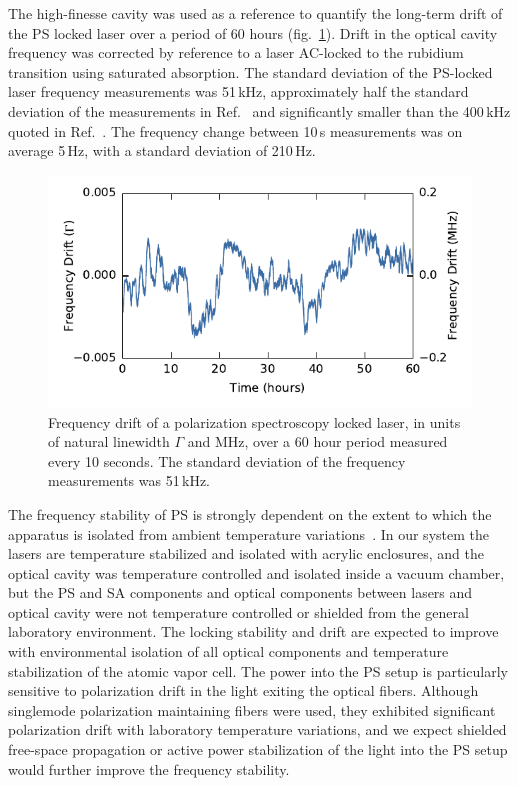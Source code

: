 The high-finesse cavity was used as a reference to quantify the long-term drift of the PS locked laser over a period of 60 hours (fig.~\ref{fig:drift}).
Drift in the optical cavity frequency was corrected by reference to a laser AC-locked to the rubidium transition using saturated absorption.
The standard deviation of the PS-locked laser frequency measurements was 51\,kHz, approximately half the standard deviation of the measurements in Ref.~\cite{tiwari_laser_2006} and significantly smaller than the 400\,kHz quoted in Ref.~\cite{lee_frequency_2014}.
The frequency change between 10\,s measurements was on average 5\,Hz, with a standard deviation of 210\,Hz.

\begin{figure}[htbp]
\centering
\includegraphics{part1/Figs/drift.pdf}
\caption{Frequency drift of a polarization spectroscopy locked laser, in units of natural linewidth $\Gamma$ and MHz, over a 60 hour period measured every 10 seconds.
The standard deviation of the frequency measurements was 51\,kHz.}
\label{fig:drift}
\end{figure}

The frequency stability of PS is strongly dependent on the extent to which the apparatus is isolated from ambient temperature variations~\cite{yoshikawa_frequency_2003}.
In our system the lasers are temperature stabilized and isolated with acrylic enclosures, and the optical cavity was temperature controlled and isolated inside a vacuum chamber, but the PS and SA components and optical components between lasers and optical cavity were not temperature controlled or shielded from the general laboratory environment.
The locking stability and drift are expected to improve with environmental isolation of all optical components and temperature stabilization of the atomic vapor cell.
The power into the PS setup is particularly sensitive to polarization drift in the light exiting the optical fibers.
Although singlemode polarization maintaining fibers were used, they exhibited significant polarization drift with laboratory temperature variations, and we expect shielded free-space propagation or active power stabilization of the light into the PS setup would further improve the frequency stability.

